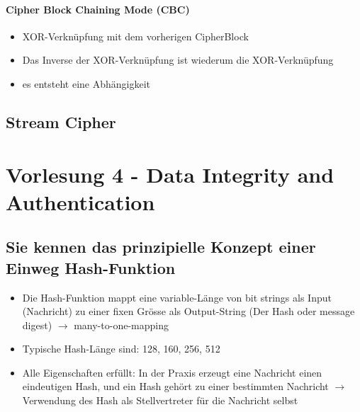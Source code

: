 \documentclass{report}
\theoremstyle{definition}
\theoremstyle{example}
\begin{document}
		\subsubsection{Cipher Block Chaining Mode (CBC)}
\begin{itemize}
	\item XOR-Verknüpfung mit dem vorherigen CipherBlock
	\item Das Inverse der XOR-Verknüpfung ist wiederum die XOR-Verknüpfung	
	\item es entsteht eine Abhängigkeit 
	
\end{itemize}

	\section{Stream Cipher}


\chapter{Vorlesung 4 - Data Integrity and Authentication}

\section{Sie kennen das prinzipielle Konzept einer Einweg Hash-Funktion}
\begin{itemize}
	\item Die Hash-Funktion mappt eine variable-Länge von bit strings als Input (Nachricht) zu einer fixen Grösse als Output-String (Der Hash oder message digest) $\rightarrow$ many-to-one-mapping
	\item Typische Hash-Länge sind: 128, 160, 256, 512
	\item Alle Eigenschaften erfüllt: In der Praxis erzeugt eine Nachricht einen eindeutigen Hash, und ein Hash gehört zu einer bestimmten Nachricht $\rightarrow$ Verwendung des Hash als Stellvertreter für die Nachricht selbst
\end{itemize}
\end{document}
